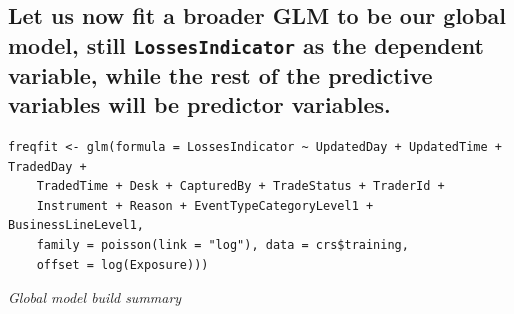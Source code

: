 \documentclass{DissertateUSU}
\begin{document}
\subsection{Let us now fit a broader GLM to be our global model, still \texttt{LossesIndicator} as the dependent variable, while the rest of the predictive variables will be predictor variables.}
\label{ssec:GLM estimation results}

\small

\begin{verbatim}
freqfit <- glm(formula = LossesIndicator ~ UpdatedDay + UpdatedTime + TradedDay + 
    TradedTime + Desk + CapturedBy + TradeStatus + TraderId + 
    Instrument + Reason + EventTypeCategoryLevel1 + BusinessLineLevel1, 
    family = poisson(link = "log"), data = crs$training, 
    offset = log(Exposure)))
\end{verbatim}

\normalsize

\emph{Global model build summary}
\end{document}
